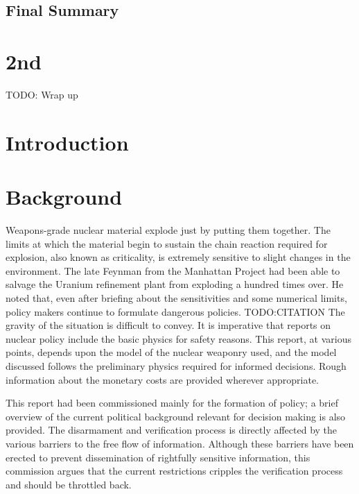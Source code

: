 \documentclass[twoside,titlepage,11pt,twocolumn,a4paper]{article}
\begin{document}
\subsection*{Final Summary}

\newpage
\tableofcontents
\twocolumn

\section{2nd}
TODO: Wrap up
\section{Introduction}
\section{Background}
Weapons-grade nuclear material explode just by putting them
together. The limits at which the material begin to sustain the chain
reaction required for explosion, also known as criticality, is
extremely sensitive to slight changes in the environment. The late
Feynman from the Manhattan Project had been able to salvage the
Uranium refinement plant from exploding a hundred times over. He noted
that, even after briefing about the sensitivities and some numerical
limits, policy makers continue to formulate dangerous
policies. TODO:CITATION The gravity of the situation is difficult to
convey. It is imperative that reports on nuclear policy include the
basic physics for safety reasons. This report, at various points,
depends upon the model of the nuclear weaponry used, and the model
discussed follows the preliminary physics required for informed
decisions. Rough information about the monetary costs are provided
wherever appropriate.

This report had been commissioned mainly for the formation of policy;
a brief overview of the current political background relevant for
decision making is also provided. The disarmament and verification
process is directly affected by the various barriers to the free flow
of information. Although these barriers have been erected to prevent
dissemination of rightfully sensitive information, this commission
argues that the current restrictions cripples the verification
process and should be throttled back. 
\end{document}
